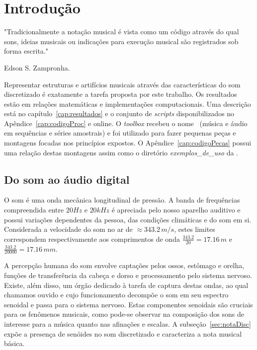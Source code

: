 \chapter{Introdução} %
\label{cap:intro} 
\epigraph{"Tradicionalmente a notação musical é vista como um código através do qual sons, ideias musicais ou indicações para execução musical são registrados sob forma escrita."}{Edson S. Zampronha.\cite{Zampronha} \\}


Representar estruturas e artifícios musicais através das características do som discretizado
é exatamente a tarefa proposta por este trabalho. Os resultados estão em relações matemáticas e implementações computacionais. Uma descrição está no capítulo~\ref{cap:resultados} e o conjunto de \emph{scripts} disponibilizados no Apêndice~\ref{cap:codigoProc} e online.\cite{MASSA} O \emph{toolbox} recebeu o nome \massa\ (música e áudio em sequências e séries amostrais) e foi utilizado para fazer pequenas peças e montagens focadas nos princípios expostos. O Apêndice~\ref{cap:codigoPecas} possui uma relação destas montagens assim como o diretório \emph{exemplos\_de\_uso} da \massa.

    \section{Do som ao áudio digital}\label{sec:audio}

O som é uma onda mecânica longitudinal de pressão. A banda de frequências compreendida entre $20Hz$ e $20 kHz$ é apreciada pelo nosso aparelho auditivo e possui variações dependentes da pessoa, das condições climáticas e do som em si.
 Considerada a velocidade do som no ar de $\approx 343.2\,m/s$,
estes limites correspondem respectivamente aos comprimentos de onda $\frac{343.2}{20} = 17.16\,m$ e $\frac{343.2}{20000}=17.16\,mm$.\cite{Roederer}


A percepção humana do som envolve captações pelos ossos, estômago e orelha, funções de transferência da cabeça e dorso e processamento pelo sistema nervoso. Existe, além disso, um órgão dedicado à tarefa de captura destas ondas, ao qual chamamos ouvido e cujo funcionamento decompõe o som em seu espectro senoidal e passa para o sistema nervoso.\cite{Roederer} Estas componentes senoidais são cruciais para os fenômenos musicais, como pode-se observar na composição dos sons de interesse para a música quanto nas afinações e escalas.\cite{floEsp} A subseção~\ref{sec:notaDisc} expõe a presença de senóides no som discretizado e caracteriza a nota musical básica.

